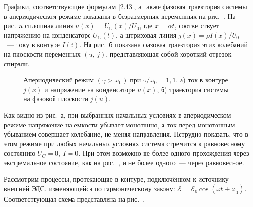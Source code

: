 Графики, соответствующие формулам \eqref{2.43}, а также фазовая траектория
системы в апериодическом режиме показаны в безразмерных переменных на
рис.~. На рис.~a сплошная линия
$u(x)=U_C(x)/U_0$, где $x=\alpha t$, соответствует напряжению на конденсаторе
$U_C(t)$, а штриховая линия $j(x)=\rho I(x)/U_0$~--- току в контуре $I(t)$.
На рис.~б показана фазовая траектория этих колебаний на плоскости
переменных $(u,\,j)$, представляющая собой
короткий отрезок спирали.

\begin{figure}[h]
	\begin{minipage}[h]{0.49\linewidth}
		\centering
	\end{minipage}
	\hfill
	\begin{minipage}[h]{0.49\linewidth}
		\centering
	\end{minipage}
	\caption{Апериодический режим $(\gamma>\omega_0)$ при
$\gamma/\omega_0=1,1$: а) ток в контуре $j(x)$ и напряжение на конденсаторе $u(x)$,
б) траектория системы на фазовой плоскости $j(u)$.}
\end{figure}

Как видно из рис.~а, 
при выбранных начальных условиях в апериодическом режиме напряжение на емкости 
убывает монотонно, а ток перед монотонным убыванием
совершает колебание, не меняя направления. Нетрудно показать, что в этом режиме при
любых начальных условиях система стремится к равновесному состоянию
$U_C=0,~I=0$. При этом возможно не более одного прохождения через экстремальное
состояние, как на рис.~, и не более одного~--- через равновесное.

\newpage

\label{sec:forced}

\label{sec:complex}

Рассмотрим процессы, протекающие в контуре, подключённом к источнику внешней
ЭДС, изменяющейся по гармоническому закону:
$\mathcal{E}=\mathcal{E}_0\cos(\omega t+\varphi_0)$. Соответствующая схема
представлена на рис.~.


